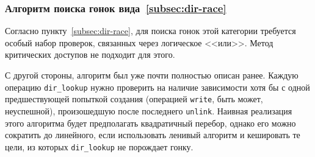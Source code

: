\subsubsection{Алгоритм поиска гонок вида~\ref{subsec:dir-race}}

Согласно пункту~\ref{subsec:dir-race}, для поиска гонок этой категории требуется особый набор проверок, связанных через логическое <<или>>. Метод критических доступов не подходит для этого.

С другой стороны, алгоритм был уже почти полностью описан ранее. Каждую операцию \texttt{dir\_lookup} нужно проверить на наличие зависимости хотя бы с одной предшествующей попыткой создания (операцией \texttt{write}, быть может, неуспешной), произошедшую после последнего \texttt{unlink}. Наивная реализация этого алгоритма будет предполагать квадратичный перебор, однако его можно сократить до линейного, если использовать ленивый алгоритм и кешировать те цели, из которых \texttt{dir\_lookup} не порождает гонку.

